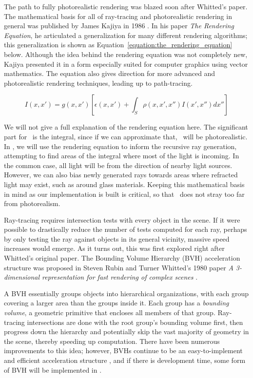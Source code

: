 
The path to fully photorealistic rendering was blazed soon after Whitted's paper.
The mathematical basis for all of ray-tracing and photorealistic rendering in general was published by James Kajiya in 1986 \cite{kajiya1986rendering}.
In his paper {\it The Rendering Equation}, he articulated a generalization for many different rendering algorithms; this generalization is shown as Equation~\ref{equation:the_rendering_equation} below.
Although the idea behind the rendering equation was not completely new, Kajiya presented it in a form especially suited for computer graphics using vector mathematics.
The equation also gives direction for more advanced and photorealistic rendering techniques, leading up to path-tracing.

\begin{equation}
  \label{equation:the_rendering_equation}
  I(x, x') = g(x, x') [\epsilon(x, x') + \int_{S} \rho(x, x',x'')I(x', x'')dx'']
\end{equation}

We will not give a full explanation of the rendering equation here.
The significant part for \name\ is the integral, since if we can approximate that, \name\ will be photorealistic.
In \name, we will use the rendering equation to inform the recursive ray generation, attempting to find areas of the integral where most of the light is incoming.
In the common case, all light will be from the direction of nearby light sources.
However, we can also bias newly generated rays towards areas where refracted light may exist, such as around glass materials.
Keeping this mathematical basis in mind as our implementation is built is critical, so that \name\ does not stray too far from photorealism.


Ray-tracing requires intersection tests with every object in the scene.
If it were possible to drastically reduce the number of tests computed for each ray, perhaps by only testing the ray against objects in its general vicinity, massive speed increases would emerge.
As it turns out, this was first explored right after Whitted's original paper.
The Bounding Volume Hierarchy (BVH) acceleration structure was proposed in Steven Rubin and Turner Whitted's 1980 paper {\it A 3-dimensional representation for fast rendering of complex scenes} \cite{rubin1980}.

A BVH essentially groups objects into hierarchical organizations, with each group covering a larger area than the groups inside it.
Each group has a {\it bounding volume}, a geometric primitive that encloses all members of that group.
Ray-tracing intersections are done with the root group's bounding volume first, then progress down the hierarchy and potentially skip the vast majority of geometry in the scene, thereby speeding up computation.
There have been numerous improvements to this idea; however, BVHs continue to be an easy-to-implement and efficient acceleration structure \cite{prunier2017bvh}, and if there is development time, some form of BVH will be implemented in \name.

